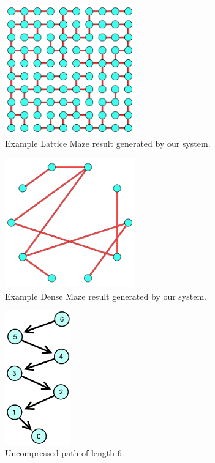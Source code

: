 \documentclass[11pt]{article}
\begin{document}
\begin{figure}[h]
\centering
\includegraphics[width=0.5\textwidth]{Lattice1}
\caption{Example Lattice Maze result generated by our system.}
\label{fig:Lattice-result}
\end{figure}

\begin{figure}[h]
\centering
\includegraphics[width=0.5\textwidth]{Dense2}
\caption{Example Dense Maze result generated by our system.}
\label{fig:Dense-result}
\end{figure}




\begin{figure}[h]
\centering
\includegraphics[width=0.25\textwidth]{UncompressedPath}
\caption{Uncompressed path of length 6.}
\label{fig:Path-NPC}
\end{figure}
\end{document}
